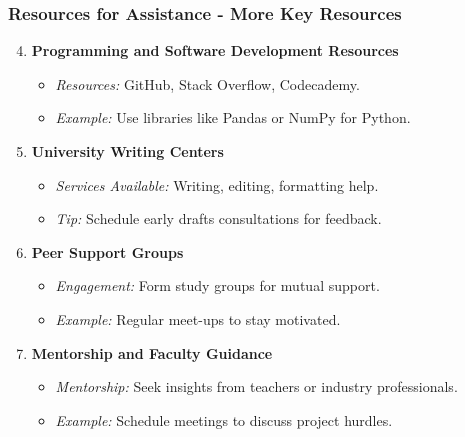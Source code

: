 \documentclass[aspectratio=169]{beamer}
\begin{document}
\begin{frame}[fragile]
    \frametitle{Resources for Assistance - More Key Resources}
    \begin{enumerate}
        \setcounter{enumi}{3} %
        \item \textbf{Programming and Software Development Resources}
            \begin{itemize}
                \item \textit{Resources:} GitHub, Stack Overflow, Codecademy.
                \item \textit{Example:} Use libraries like Pandas or NumPy for Python.
            \end{itemize}
        \item \textbf{University Writing Centers}
            \begin{itemize}
                \item \textit{Services Available:} Writing, editing, formatting help.
                \item \textit{Tip:} Schedule early drafts consultations for feedback.
            \end{itemize}
        \item \textbf{Peer Support Groups}
            \begin{itemize}
                \item \textit{Engagement:} Form study groups for mutual support.
                \item \textit{Example:} Regular meet-ups to stay motivated.
            \end{itemize}
        \item \textbf{Mentorship and Faculty Guidance}
            \begin{itemize}
                \item \textit{Mentorship:} Seek insights from teachers or industry professionals.
                \item \textit{Example:} Schedule meetings to discuss project hurdles.
            \end{itemize}
    \end{enumerate}
\end{frame}
\end{document}
